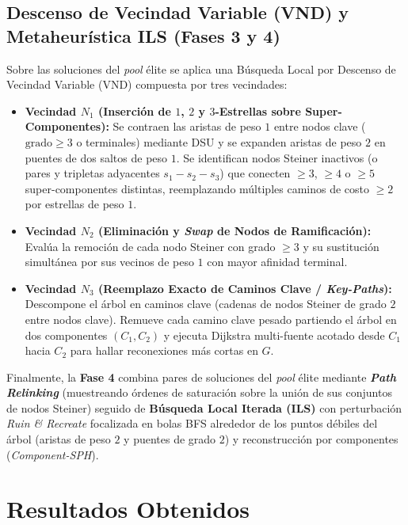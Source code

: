 \documentclass[11pt,a4paper]{article}
\begin{document}
\subsection{Descenso de Vecindad Variable (VND) y Metaheurística ILS (Fases 3 y 4)}
Sobre las soluciones del \textit{pool} élite se aplica una Búsqueda Local por Descenso de Vecindad Variable (VND) \cite{ribeiro2002hybrid} compuesta por tres vecindades:
\begin{itemize}
    \item \textbf{Vecindad $N_1$ (Inserción de $1$, $2$ y $3$-Estrellas sobre Super-Componentes):} Se contraen las aristas de peso $1$ entre nodos clave ($\text{grado} \ge 3$ o terminales) mediante DSU y se expanden aristas de peso $2$ en puentes de dos saltos de peso $1$. Se identifican nodos Steiner inactivos (o pares y tripletas adyacentes $s_1 - s_2 - s_3$) que conecten $\ge 3$, $\ge 4$ o $\ge 5$ super-componentes distintas, reemplazando múltiples caminos de costo $\ge 2$ por estrellas de peso $1$.
    \item \textbf{Vecindad $N_2$ (Eliminación y \textit{Swap} de Nodos de Ramificación):} Evalúa la remoción de cada nodo Steiner con grado $\ge 3$ y su sustitución simultánea por sus vecinos de peso $1$ con mayor afinidad terminal.
    \item \textbf{Vecindad $N_3$ (Reemplazo Exacto de Caminos Clave / \textit{Key-Paths}):} Descompone el árbol en caminos clave (cadenas de nodos Steiner de grado $2$ entre nodos clave). Remueve cada camino clave pesado partiendo el árbol en dos componentes $(C_1, C_2)$ y ejecuta Dijkstra multi-fuente acotado desde $C_1$ hacia $C_2$ para hallar reconexiones más cortas en $G$.
\end{itemize}
Finalmente, la \textbf{Fase 4} combina pares de soluciones del \textit{pool} élite mediante \textbf{\textit{Path Relinking}} (muestreando órdenes de saturación sobre la unión de sus conjuntos de nodos Steiner) seguido de \textbf{Búsqueda Local Iterada (ILS)} con perturbación \textit{Ruin \& Recreate} focalizada en bolas BFS alrededor de los puntos débiles del árbol (aristas de peso $2$ y puentes de grado $2$) y reconstrucción por componentes (\textit{Component-SPH}).

\section{Resultados Obtenidos}
\label{sec:resultados}
\end{document}
